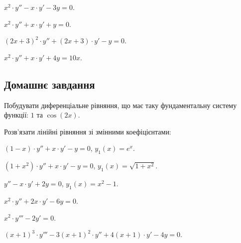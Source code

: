 \begin{problem}
	$x^2 \cdot y'' - x \cdot y' - 3 y = 0$.
\end{problem}

\begin{problem}
	$x^2 \cdot y'' + x \cdot y' + y = 0$.
\end{problem}

\begin{problem}
	$(2 x + 3)^2 \cdot y'' + (2 x + 3) \cdot y' - y = 0$.
\end{problem}

\begin{problem}
	$x^2 \cdot y'' + x \cdot y' + 4 y = 10 x$.
\end{problem}

\subsection*{Домашнє завдання}

\begin{problem}
	Побудувати диференціальне рівняння, що має таку фундаментальну систему функції: $1$ та $\cos (2x)$.
\end{problem}

Розв'язати лінійні рівняння зі змінними коефіцієнтами:

\begin{problem}
	$(1 - x) \cdot y'' + x \cdot y' - y = 0$, $y_1(x) = e^x$. 
\end{problem}

\begin{problem}
	$(1 + x^2) \cdot y'' + x \cdot y' - y = 0$, $y_1(x) = \sqrt{1 + x^2}$.
\end{problem}

\begin{problem}
	$y'' - x \cdot y' + 2 y = 0$, $y_1(x) = x^2 - 1$.
\end{problem}

\begin{problem}
	$x^2 \cdot y'' + 2 x \cdot y' - 6 y = 0$.
\end{problem}

\begin{problem}
	$x^2 \cdot y''' - 2 y' = 0$.
\end{problem}

\begin{problem}
	$(x + 1)^3 \cdot y''' - 3 (x + 1)^2 \cdot y'' + 4 (x + 1) \cdot y' - 4 y = 0$.
\end{problem}

